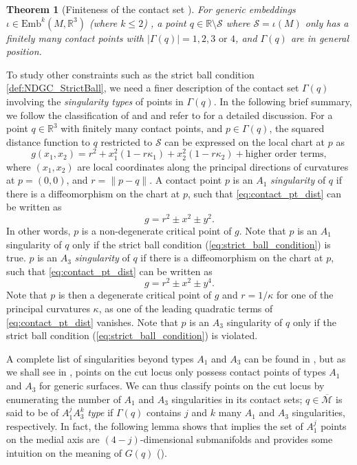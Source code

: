 \documentclass[11pt]{article}
\newcommand{\R}{\mathbb{R}}
\newcommand{\Emb}{\mathrm{Emb}^k(M,\R^3)}
\newcommand{\med}{\mathcal{M}}
\newcommand{\Surf}{\mathcal{S}}
\theoremstyle{plain}
\newtheorem{thm}{Theorem}
\theoremstyle{definition}
\theoremstyle{remark}
\begin{document}
\begin{thm}[Finiteness of the contact set \citep{yomdin_local_1981}]
	\label{thm:finite_contact}
For generic embeddings $\iota \in \Emb$ (where $k \leq 2$) , a point $q \in \R \setminus \Surf$ where $\Surf = \iota(M)$ only has a finitely many contact points with $|\Gamma(q)| = 1, 2, 3 \text{ or } 4$, and $\Gamma(q)$ are in general position.
\end{thm}

To study other constraints such as the strict ball condition \ref{def:NDGC_StrictBall}, we need a finer description of the contact set $\Gamma(q)$ involving the \emph{singularity types} of points in $\Gamma(q)$. In the following brief summary, we follow the classification of \cite{mather_distance_1983} and \cite{bruce1992curves} and refer to \cite{cazals_differential_2005} for a detailed discussion. For a point $q \in \R^3$ with finitely many contact points, and $p \in \Gamma(q)$, the squared distance function to $q$ restricted to $\Surf$ can be expressed on the local chart at $p$ as 
\begin{equation} \label{eq:contact_pt_dist}
    g(x_1,x_2) = r^2 + x_1^2(1-r\kappa_1) + x_2^2(1-r\kappa_2) + \text{higher order terms},
\end{equation}
where $(x_1,x_2)$ are local coordinates along the principal directions of curvatures at $p = (0,0)$, and $r = \| p-q\|$. A contact point $p$ is an $A_1$ \emph{singularity} of $q$ if there is a diffeomorphism on the chart at $p$, such that \cref{eq:contact_pt_dist} can be written as 
\[g = r^2 \pm x^2 \pm y^2.\]
In other words, $p$ is a non-degenerate critical point of $g$. Note that $p$ is an $A_1$ singularity of $q$ only if the strict ball condition (\cref{eq:strict_ball_condition}) is true. $p$ is an $A_3$ \emph{singularity} of $q$ if there is a diffeomorphism on the chart at $p$, such that \cref{eq:contact_pt_dist} can be written as 
\[g = r^2 \pm x^2 \pm y^4.\]
Note that $p$ is then a degenerate critical point of $g$ and $r = 1/\kappa$ for one of the principal curvatures $\kappa$, as one of the leading quadratic terms of \cref{eq:contact_pt_dist} vanishes. Note that $p$ is an $A_3$ singularity of $q$ only if the strict ball condition (\cref{eq:strict_ball_condition}) is violated. 

A complete list of singularities beyond types $A_1$ and $A_3$ can be found in \cite{arnol1974normal}, but as we shall see in , points on the cut locus only possess contact points of types $A_1$ and $A_3$ for generic surfaces. We can thus classify points on the cut locus by enumerating the number of $A_1$ and $A_3$ singularities in its contact sets; $q \in \overline{\med}$ is said to be of $A_1^j A_3^k$ \emph{type} if $\Gamma(q)$ contains $j$ and $k$ many $A_1$ and $A_3$ singularities, respectively. In fact, the following lemma shows that  implies the set of $A_1^j$ points on the medial axis are $(4-j)$-dimensional submanifolds and provides some intuition on the meaning of $G(q)$ ().
\end{document}
